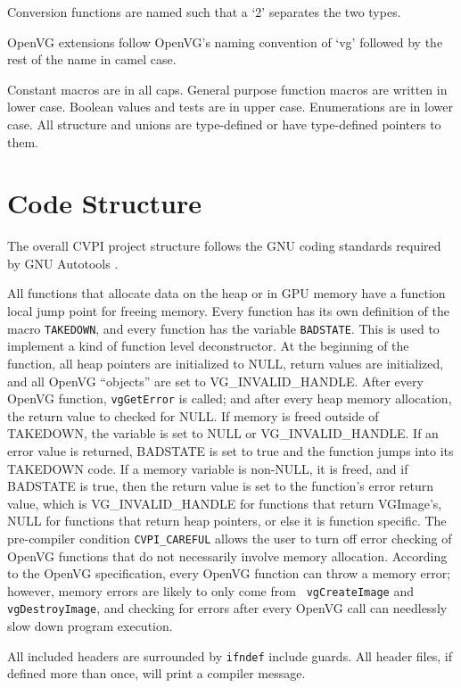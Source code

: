 \documentclass[12pt]{report}
\begin{document}
Conversion functions are named such that a `2' separates the two
types.

OpenVG extensions follow OpenVG's naming convention of `vg'
followed by the rest of the name in camel case.

Constant macros are in all caps. General purpose function macros are
written in lower case. Boolean values and tests are in upper
case. Enumerations are in lower case. All structure and unions are
type-defined or have type-defined pointers to them.
\section{Code Structure}
\label{sec-11-2}
The overall CVPI project structure follows the GNU coding standards
required by GNU Autotools \cite{gnuSTD}.

All functions that allocate data on the heap or in GPU memory have a
function local jump point for freeing memory. Every function has its
own definition of the macro {\tt TAKEDOWN}, and every function has the
variable {\tt BADSTATE}. This is used to implement a kind of function
level deconstructor. At the beginning of the function, all heap
pointers are initialized to NULL, return values are initialized, and
all OpenVG ``objects'' are set to VG\_INVALID\_HANDLE. After every
OpenVG function, {\tt vgGetError} is called; and after every heap
memory allocation, the return value to checked for NULL. If memory is
freed outside of TAKEDOWN, the variable is set to NULL or
VG\_INVALID\_HANDLE. If an error value is returned, BADSTATE is set to
true and the function jumps into its TAKEDOWN code. If a memory
variable is non-NULL, it is freed, and if BADSTATE is true, then the
return value is set to the function's error return value, which is
VG\_INVALID\_HANDLE for functions that return VGImage's, NULL for
functions that return heap pointers, or else it is function
specific. The pre-compiler condition {\tt CVPI\_CAREFUL} allows the
user to turn off error checking of OpenVG functions that do not
necessarily involve memory allocation. According to the OpenVG
specification, every OpenVG function can throw a memory error;
however, memory errors are likely to only come from {\tt
  vgCreateImage} and {\tt vgDestroyImage}, and checking for errors
after every OpenVG call can needlessly slow down program execution.

All included headers are surrounded by {\tt ifndef} include guards. All
header files, if defined more than once, will print a compiler
message.
\end{document}
